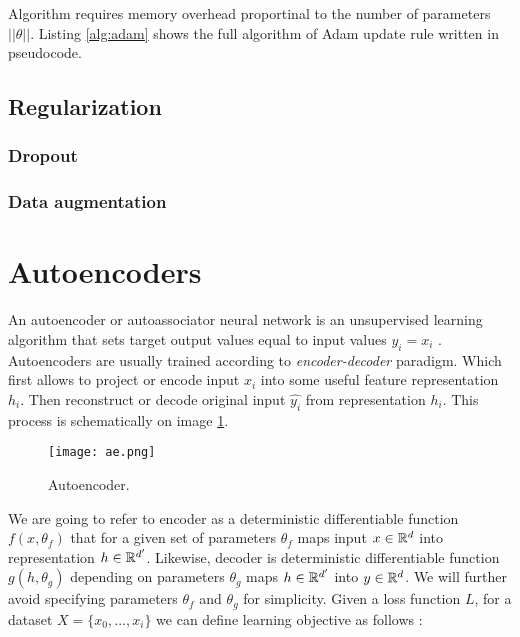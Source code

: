 Algorithm requires memory overhead proportinal to the number of parameters $||\theta||$. Listing \ref{alg:adam} shows the full algorithm of Adam update rule written in pseudocode.



\subsection{Regularization}
\subsubsection{Dropout}
\subsubsection{Data augmentation}





\section{Autoencoders}\label{ch:ae}
An autoencoder or autoassociator neural network is an unsupervised learning algorithm that sets target output values equal to input values $y_i=x_i$ \cite{Ng2011,RanzatoMarcAurelio2007}.
Autoencoders are usually trained according to \textit{encoder-decoder} paradigm.
Which first allows to project or encode input $x_i$ into some useful feature representation $h_i$.
Then reconstruct or decode original input $\hat{y_i}$ from representation $h_i$.
This process is schematically on image \ref{fig:ae}.

\begin{figure}[h!]
  \centering
    \texttt{[image: ae.png]}
  \caption{Autoencoder.}
  \label{fig:ae}
\end{figure}



We are going to refer to encoder as a deterministic differentiable function $f(x, \theta_f)$ that for a given set of parameters $\theta_f$ maps input $x\in \Bbb{R}^d$ into representation $h \in \Bbb{R}^{d'}$.
Likewise, decoder is deterministic differentiable function $g(h, \theta_g)$ depending on parameters $\theta_g$ maps $h\in\Bbb{R}^{d'}$ into $y\in \Bbb{R}^d$. We will further avoid specifying parameters $\theta_f$ and $\theta_g$ for simplicity.
Given a loss function $L$, for a dataset $X=\{x_0, ..., x_i\}$ we can define learning objective as follows \cite{Good2016}:

